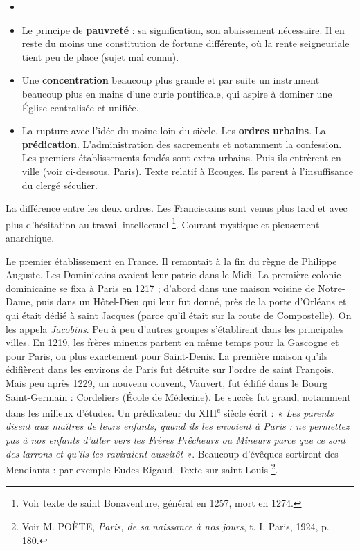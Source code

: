 \documentclass[french,twoside]{book} %
\begin{document}
\begin{itemize}[itemsep=0pt,]
\item[] \hspace{-1.5em}{\bfseries Qu’apportaient de neuf ces deux ordres ?}
\item Le principe de {\bfseries pauvreté} : sa signification, son abaissement nécessaire. Il en reste du moins une constitution de fortune différente, où la rente seigneuriale tient peu de place (sujet mal connu).
\item Une {\bfseries concentration} beaucoup plus grande et par suite un instrument beaucoup plus en mains d’une curie pontificale, qui aspire à dominer une Église centralisée et unifiée.
\item La rupture avec l’idée du moine loin du siècle. Les {\bfseries ordres urbains}. La {\bfseries prédication}. L’administration des sacrements et notamment la confession. Les premiers établissements fondés sont extra urbains. Puis ils entrèrent en ville (voir ci-dessous, Paris). Texte relatif à Ecouges. Ils parent à l’insuffisance du clergé séculier.
\end{itemize}
\noindent La différence entre les deux ordres. Les Franciscains sont venus plus tard et avec plus d’hésitation au travail intellectuel \footnote{Voir texte de saint Bonaventure, général en 1257, mort en 1274.}. Courant mystique et pieusement anarchique.\par
Le premier établissement en France. Il remontait à la fin du règne de Philippe Auguste. Les Dominicains avaient leur patrie dans le Midi. La première colonie dominicaine se fixa à Paris en 1217 ; d’abord dans une maison voisine de Notre-Dame, puis dans un Hôtel-Dieu qui leur fut donné, près de la porte d’Orléans et qui était dédié à saint Jacques (parce qu’il était sur la route de Compostelle). On les appela \emph{Jacobins}. Peu à peu d’autres groupes s’établirent dans les principales villes. En 1219, les frères mineurs partent en même temps pour la Gascogne et pour Paris, ou plus exactement pour Saint-Denis. La première maison qu’ils édifièrent dans les environs de Paris fut détruite sur l’ordre de saint François. Mais peu après 1229, un nouveau couvent, Vauvert, fut édifié dans le Bourg Saint-Germain : Cordeliers (École de Médecine). Le succès fut grand, notamment dans les milieux d’études. Un prédicateur du XIII\textsuperscript{e} siècle écrit : \emph{« Les parents disent aux maîtres de leurs enfants, quand ils les envoient à Paris : ne permettez pas à nos enfants d’aller vers les Frères Prêcheurs ou Mineurs parce que ce sont des larrons et qu’ils les raviraient aussitôt »}. Beaucoup d’évêques sortirent des Mendiants : par exemple Eudes Rigaud. Texte sur saint Louis \footnote{ Voir M. POÈTE, {\itshape Paris, de sa naissance à nos jours}, t. I, Paris, 1924, p. 180.}.\par
\end{document}
